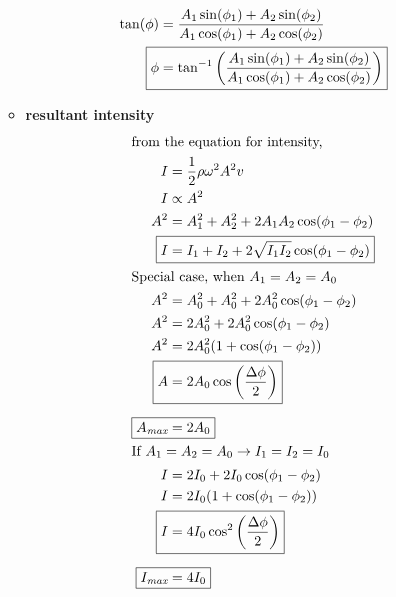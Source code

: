 \begin{itemize}
\begin{itemize}
\begin{align*}
            \tan(\phi) &= \frac{A_1 \sin(\phi_1) + A_2 \sin(\phi_2)}{A_1 \cos(\phi_1) + A_2 \cos(\phi_2)}\\
            \Aboxed{\phi &= \tan^{-1}\left(\frac{A_1 \sin(\phi_1) + A_2 \sin(\phi_2)}{A_1 \cos(\phi_1) + A_2 \cos(\phi_2)}\right)}\\
        \end{align*}
        \begin{center}
        \end{center}
        \item \textbf{resultant intensity}
        \begin{align*}
            \intertext{from the equation for intensity,}
            I &= \frac{1}{2} \rho \omega^2 A^2 v\\
            I &\propto A^2\\
            A^2 &= A_1^2 + A_2^2 + 2A_1A_2\cos(\phi_1 - \phi_2)\\
            \Aboxed{I &= I_1 + I_2 + 2\sqrt{I_1I_2}\cos(\phi_1 - \phi_2)}\\
            \intertext{Special case, when $A_1=A_2=A_0$}
            A^2 &= A_0^2 + A_0^2 + 2A_0^2\cos(\phi_1 - \phi_2)\\
            A^2 &= 2A_0^2 + 2A_0^2\cos(\phi_1 - \phi_2)\\
            A^2 &= 2A_0^2(1 + \cos(\phi_1 - \phi_2))\\
            \Aboxed{A &= 2A_0\cos\left(\frac{\Delta \phi}{2}\right)}\\[2mm]
            \Aboxed{A_{\textit{max}} &= 2A_0}\\
            \intertext{If $A_1=A_2=A_0 \rightarrow I_1=I_2=I_0$ }
            I &= 2I_0 + 2I_0\cos(\phi_1 - \phi_2)\\
            I &= 2I_0(1 + \cos(\phi_1 - \phi_2))\\
            \Aboxed{I &= 4I_0\cos^2\left(\frac{\Delta \phi}{2}\right)}\\[2mm]
            \Aboxed{I_{\textit{max}} &= 4I_0}\\

\end{align*}
\end{itemize}
\end{itemize}
